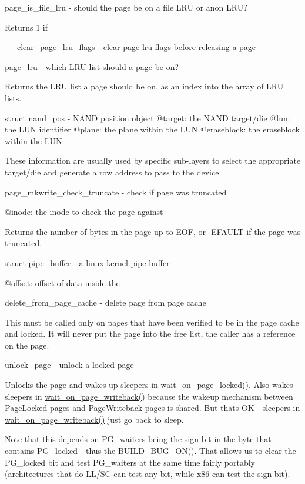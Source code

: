 page\+\_\+is\+\_\+file\+\_\+lru -\/ should the page be on a file L\+RU or anon L\+RU?

Returns 1 if

\+\_\+\+\_\+clear\+\_\+page\+\_\+lru\+\_\+flags -\/ clear page lru flags before releasing a page

page\+\_\+lru -\/ which L\+RU list should a page be on?

Returns the L\+RU list a page should be on, as an index into the array of L\+RU lists.

struct \mbox{\hyperlink{structnand__pos}{nand\+\_\+pos}} -\/ N\+A\+ND position object @target\+: the N\+A\+ND target/die @lun\+: the L\+UN identifier @plane\+: the plane within the L\+UN @eraseblock\+: the eraseblock within the L\+UN

These information are usually used by specific sub-\/layers to select the appropriate target/die and generate a row address to pass to the device.

page\+\_\+mkwrite\+\_\+check\+\_\+truncate -\/ check if page was truncated

@inode\+: the inode to check the page against

Returns the number of bytes in the page up to E\+OF, or -\/E\+F\+A\+U\+LT if the page was truncated.

struct \mbox{\hyperlink{structpipe__buffer}{pipe\+\_\+buffer}} -\/ a linux kernel pipe buffer

@offset\+: offset of data inside the

delete\+\_\+from\+\_\+page\+\_\+cache -\/ delete page from page cache

This must be called only on pages that have been verified to be in the page cache and locked. It will never put the page into the free list, the caller has a reference on the page.

unlock\+\_\+page -\/ unlock a locked page

Unlocks the page and wakes up sleepers in \mbox{\hyperlink{linux_2pagemap_8h_a405f54ac2a8acbc7efe30bd63d042bf0}{wait\+\_\+on\+\_\+page\+\_\+locked()}}. Also wakes sleepers in \mbox{\hyperlink{linux_2pagemap_8h_a29d56381a70b8a066eb3fde1b03fa797}{wait\+\_\+on\+\_\+page\+\_\+writeback()}} because the wakeup mechanism between Page\+Locked pages and Page\+Writeback pages is shared. But that\textquotesingle{}s OK -\/ sleepers in \mbox{\hyperlink{linux_2pagemap_8h_a29d56381a70b8a066eb3fde1b03fa797}{wait\+\_\+on\+\_\+page\+\_\+writeback()}} just go back to sleep.

Note that this depends on P\+G\+\_\+waiters being the sign bit in the byte that \mbox{\hyperlink{protocolcontains-p}{contains}} P\+G\+\_\+locked -\/ thus the \mbox{\hyperlink{build__bug_8h_a0fc08f11f6c83dbc94a75ca49d29fae8}{B\+U\+I\+L\+D\+\_\+\+B\+U\+G\+\_\+\+O\+N()}}. That allows us to clear the P\+G\+\_\+locked bit and test P\+G\+\_\+waiters at the same time fairly portably (architectures that do L\+L/\+SC can test any bit, while x86 can test the sign bit).

